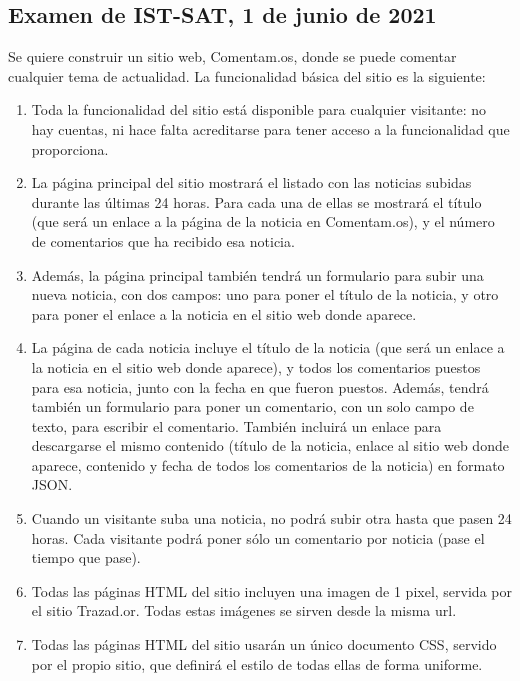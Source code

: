\subsection{Examen de IST-SAT, 1 de junio de 2021}

Se quiere construir un sitio web, Comentam.os, donde se puede comentar cualquier tema de actualidad. La funcionalidad básica del sitio es la siguiente:

\begin{enumerate}
\item Toda la funcionalidad del sitio está disponible para cualquier visitante: no hay cuentas, ni hace falta acreditarse para tener acceso a la funcionalidad que proporciona.

\item La página principal del sitio mostrará el listado con las noticias subidas durante las últimas 24 horas. Para cada una de ellas se mostrará el título (que será un enlace a la página de la noticia en Comentam.os), y el número de comentarios que ha recibido esa noticia.

\item Además, la página principal también tendrá un formulario para subir una nueva noticia, con dos campos: uno para poner el título de la noticia, y otro para poner el enlace a la noticia en el sitio web donde aparece.

\item La página de cada noticia incluye el título de la noticia (que será un enlace a la noticia en el sitio web donde aparece), y todos los comentarios puestos para esa noticia, junto con la fecha en que fueron puestos. Además, tendrá también un formulario para poner un comentario, con un solo campo de texto, para escribir el comentario. También incluirá un enlace para descargarse el mismo contenido (título de la noticia, enlace al sitio web donde aparece, contenido y fecha de todos los comentarios de la noticia) en formato JSON.

\item Cuando un visitante suba una noticia, no podrá subir otra hasta que pasen 24 horas. Cada visitante podrá poner sólo un comentario por noticia (pase el tiempo que pase).

\item Todas las páginas HTML del sitio incluyen una imagen de 1 pixel, servida por el sitio Trazad.or. Todas estas imágenes se sirven desde la misma url.

\item Todas las páginas HTML del sitio usarán un único documento CSS, servido por el propio sitio, que definirá el estilo de todas ellas de forma uniforme.
\end{enumerate}

